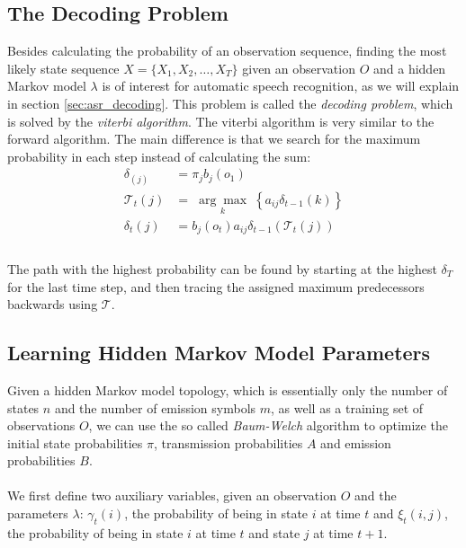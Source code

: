 \subsection{The Decoding Problem}
\label{sec:hmm_viterbi}
Besides calculating the probability of an observation sequence, finding the most likely state sequence $X = \{X_1, X_2, \dots, X_T\}$ given an observation $O$ and a hidden Markov model $\lambda$ is of interest for automatic speech recognition, as we will explain in section \ref{sec:asr_decoding}. 
This problem is called the \textit{decoding problem}, which is solved by the \textit{viterbi algorithm}. The viterbi algorithm is very similar to the forward algorithm. The main difference is that we search for the maximum probability in each step instead of calculating the sum: \\
\begin{align*}
\delta_(j) &= \pi_j b_j(o_1) \\
\mathcal{T}_t(j) &= \; \underset{k}{\arg \max} \; \left\{  a_{ij}\delta_{t-1}(k) \right\} \\
\delta_t(j) &= b_j(o_t) a_{ij}\delta_{t-1}(\mathcal{T}_t(j)) \\
\end{align*} \\ 
The path with the highest probability can be found by starting at the highest $\delta_T$ for the last time step, and then tracing the assigned maximum predecessors backwards using $\mathcal{T}$.
\subsection{Learning Hidden Markov Model Parameters}
\label{sec:learning_hmm}
Given a hidden Markov model topology, which is essentially only the number of states $n$ and the number of emission symbols $m$, as well as a training set of observations $O$, we can use the so called \textit{Baum-Welch} algorithm to optimize the initial state probabilities $\pi$, transmission probabilities $A$ and emission probabilities $B$. \\ \\
We first define two auxiliary variables, given an observation $O$ and the parameters $\lambda$: $\gamma_t(i)$, the probability of being in state $i$ at time $t$ and $\xi_t(i, j)$, the probability of being in state $i$ at time $t$ and state $j$ at time $t + 1$.


